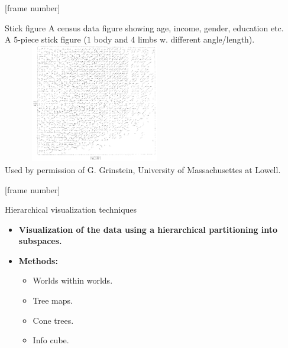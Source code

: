 \documentclass[aspectratio=169,t]{beamer}
\begin{document}
  {
    [frame number]
    \begin{frame}{Stick figure}
    A census data figure showing age, income, gender, education etc. \\
    A $5$-piece stick figure ($1$ body and $4$ limbs w. different angle/length).\\[0.1cm]
    \centering
    \includegraphics[width=8cm, height=5.2cm]{img/stick_figure.png}\\
    \tiny{Used by permission of G. Grinstein, University of Massachusettes at Lowell.}
    \end{frame}
  }

  {
    [frame number]
    \begin{frame}{Hierarchical visualization techniques}
    \centering
    \begin{itemize}
      \item \textbf{Visualization of the data using a hierarchical partitioning into subspaces.}
      \item \textbf{Methods:}
      \begin{itemize}
        \item Worlds within worlds.
        \item Tree maps.
        \item Cone trees.
        \item Info cube.
      \end{itemize}
    \end{itemize}
    \end{frame}
  }
\end{document}
